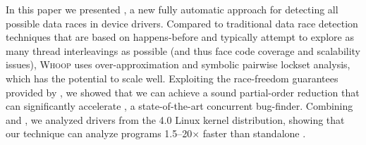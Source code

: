 In this paper we presented \whoop, a new fully automatic approach for detecting all possible data races in device drivers. Compared to traditional data race detection techniques that are based on happens-before and typically attempt to explore as many thread interleavings as possible (and thus face code coverage and scalability issues), \textsc{Whoop} uses over-approximation and symbolic pairwise lockset analysis, which has the potential to scale well. Exploiting the race-freedom guarantees provided by \whoop, we showed that we can achieve a sound partial-order reduction that can significantly accelerate \corral, a state-of-the-art concurrent bug-finder. Combining \whoop and \corral, we analyzed \sizeOfBenchmarks drivers from the 4.0 Linux kernel distribution, showing that our technique can analyze programs 1.5--20$\times$ faster than standalone \corral.